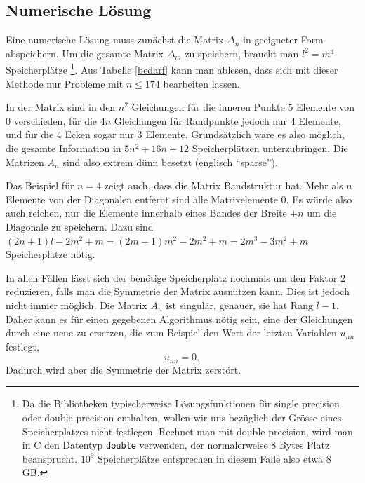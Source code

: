\subsection{Numerische Lösung}
Eine numerische Lösung
muss zunächst die Matrix $\Delta_n$ in geeigneter Form abspeichern.
Um die gesamte Matrix $\Delta_m$ zu speichern, braucht man $l^2=m^4$
Speicherplätze%
\footnote{Da die Bibliotheken typischerweise
Lösungsfunktionen für single precision oder double precision
enthalten, wollen wir uns bezüglich der Grösse eines Speicherplatzes
nicht festlegen. Rechnet man mit double precision, wird man in C
den Datentyp {\tt double} verwenden, der normalerweise 8 Bytes Platz
beansprucht. $10^9$ Speicherplätze entsprechen in diesem Falle also
etwa 8 GB.}.  Aus Tabelle \ref{bedarf} kann man ablesen, dass sich mit
dieser Methode nur Probleme mit $n\le 174$ bearbeiten lassen.

In der Matrix sind in den $n^2$ Gleichungen für die inneren Punkte
$5$ Elemente von $0$ verschieden, für die $4n$ Gleichungen für
Randpunkte jedoch nur $4$ Elemente, und für die $4$ Ecken sogar nur $3$
Elemente. Grundsätzlich wäre es also möglich, die gesamte Information
in $ 5n^2+16n+12$ Speicherplätzen unterzubringen.  Die Matrizen $A_n$
sind also extrem dünn besetzt (englisch ``sparse'').

Das Beispiel für $n=4$ zeigt auch, dass die Matrix Bandstruktur hat. Mehr
als $n$ Elemente von der Diagonalen entfernt sind alle Matrixelemente
$0$. Es würde also auch reichen, nur die Elemente innerhalb eines Bandes
der Breite $\pm n$ um die Diagonale zu speichern.  Dazu sind $(2n+1)l -
2m^2+m=(2m-1)m^2-2m^2+m=2m^3-3m^2+m$ Speicherplätze nötig.

In allen Fällen lässt sich der benötige Speicherplatz nochmals um
den Faktor 2 reduzieren, falls man die Symmetrie der Matrix ausnutzen
kann. Dies ist jedoch nicht immer möglich. Die Matrix $A_n$ ist
singulär, genauer, sie hat Rang $l-1$.  Daher kann es für einen
gegebenen Algorithmus nötig sein, eine der Gleichungen durch eine neue
zu ersetzen, die zum Beispiel den Wert der letzten Variablen $u_{nn}$
festlegt,
\[
u_{nn}=0,
\]
Dadurch wird aber die Symmetrie der Matrix zerstört.

